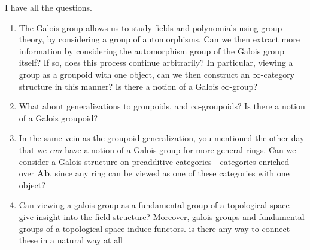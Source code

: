 I have all the questions.
\begin{enumerate}
	\item The Galois group allows us to study fields and polynomials using group theory, by considering a group of automorphisms. Can we then extract more information by considering the automorphism group of the Galois group itself? If so, does this process continue arbitrarily? In particular, viewing a group as a groupoid with one object, can we then construct an $\infty $-category structure in this manner? Is there a notion of a Galois $\infty $-group?
	\item What about generalizations to groupoids, and $\infty $-groupoids? Is there a notion of a Galois groupoid?
	\item In the same vein as the groupoid generalization, you mentioned the other day that we \emph{can} have a notion of a Galois group for more general rings. Can we consider a Galois structure on preadditive categories - categories enriched over $\mathbf{Ab} $, since any ring can be viewed as one of these categories with one object?
	\item Can viewing a galois group as a fundamental group of a topological space give insight into the field structure? Moreover, galois groups and fundamental groups of a topological space induce functors. is there any way to connect these in a natural way at all
\end{enumerate}

